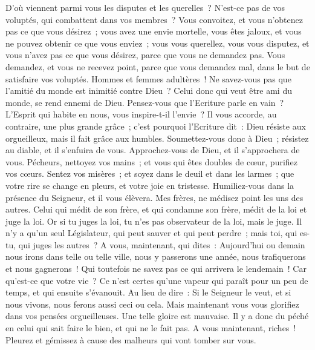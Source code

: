 \begin{multicols}{2}
\VerseOne{}D'où viennent parmi vous les disputes et les querelles~? N'est-ce pas de vos voluptés, qui combattent dans vos membres~?
Vous convoitez, et vous n'obtenez pas ce que vous désirez~; vous avez une envie mortelle, vous êtes jaloux, et vous ne pouvez obtenir ce que vous enviez~; vous vous querellez, vous vous disputez, et vous n'avez pas ce que vous désirez, parce que vous ne demandez pas.
Vous demandez, et vous ne recevez point, parce que vous demandez mal, dans le but de satisfaire vos voluptés.
Hommes et femmes adultères~! Ne savez-vous pas que l'amitié du monde est inimitié contre Dieu~? Celui donc qui veut être ami du monde, se rend ennemi de Dieu.
Pensez-vous que l'Ecriture parle en vain~? L'Esprit qui habite en nous, vous inspire-t-il l'envie~?
Il vous accorde, au contraire, une plus grande grâce~; c'est pourquoi l'Ecriture dit~: Dieu résiste aux orgueilleux, mais il fait grâce aux humbles.
Soumettez-vous donc à Dieu~; résistez au diable, et il s'enfuira de vous.
Approchez-vous de Dieu, et il s'approchera de vous. Pécheurs, nettoyez vos mains~; et vous qui êtes doubles de cœur, purifiez vos cœurs.
Sentez vos misères~; et soyez dans le deuil et dans les larmes~; que votre rire se change en pleurs, et votre joie en tristesse.
Humiliez-vous dans la présence du Seigneur, et il vous élèvera.
Mes frères, ne médisez point les uns des autres. Celui qui médit de son frère, et qui condamne son frère, médit de la loi et juge la loi. Or si tu juges la loi, tu n'es pas observateur de la loi, mais le juge.
Il n'y a qu'un seul Législateur, qui peut sauver et qui peut perdre~; mais toi, qui es-tu, qui juges les autres~?
A vous, maintenant, qui dites~: Aujourd'hui ou demain nous irons dans telle ou telle ville, nous y passerons une année, nous trafiquerons et nous gagnerons~!
Qui toutefois ne savez pas ce qui arrivera le lendemain~! Car qu'est-ce que votre vie~? Ce n'est certes qu'une vapeur qui paraît pour un peu de temps, et qui ensuite s'évanouit.
Au lieu de dire~: Si le Seigneur le veut, et si nous vivons, nous ferons aussi ceci ou cela.
Mais maintenant vous vous glorifiez dans vos pensées orgueilleuses. Une telle gloire est mauvaise.
Il y a donc du péché en celui qui sait faire le bien, et qui ne le fait pas.
\VerseOne{}A vous maintenant, riches~! Pleurez et gémissez à cause des malheurs qui vont tomber sur vous.

\end{multicols}
